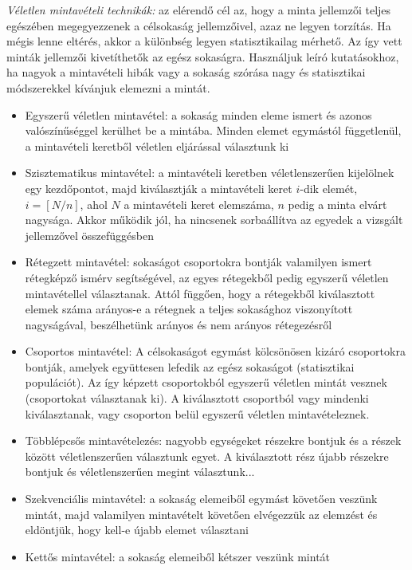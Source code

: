 \emph{Véletlen mintavételi technikák:} az elérendő cél az, hogy 
a minta jellemzői teljes egészében megegyezzenek a célsokaság jellemzőivel, azaz ne legyen torzítás. Ha mégis lenne eltérés, akkor a különbség legyen statisztikailag mérhető. Az így vett minták jellemzői kivetíthetők az egész sokaságra. Használjuk leíró kutatásokhoz, ha nagyok a mintavételi hibák vagy a sokaság szórása nagy és statisztikai módszerekkel kívánjuk elemezni a mintát.
\begin{itemize}
\item Egyszerű véletlen mintavétel: a sokaság minden eleme ismert és azonos valószínűséggel kerülhet be a mintába. Minden elemet egymástól függetlenül, a mintavételi keretből véletlen eljárással választunk ki
\item Szisztematikus mintavétel: a mintavételi keretben véletlenszerűen kijelölnek egy kezdőpontot, majd kiválasztják a mintavételi keret $i$-dik elemét, $i = [N/n]$, ahol $N$ a mintavételi keret elemszáma, $n$ pedig a minta elvárt nagysága. Akkor működik jól, ha nincsenek sorbaállítva az egyedek a vizsgált jellemzővel összefüggésben
\item Rétegzett mintavétel: sokaságot csoportokra bontják valamilyen ismert rétegképző ismérv segítségével, az egyes rétegekből pedig egyszerű véletlen mintavétellel választanak. Attól függően, hogy a rétegekből kiválasztott elemek száma arányos-e a rétegnek a teljes sokasághoz viszonyított nagyságával, beszélhetünk arányos és nem arányos rétegezésről
\item Csoportos mintavétel: A célsokaságot egymást kölcsönösen kizáró csoportokra bontják, amelyek együttesen lefedik az egész sokaságot (statisztikai populációt). Az így képzett csoportokból egyszerű véletlen mintát vesznek (csoportokat választanak ki). A kiválasztott csoportból vagy mindenki kiválasztanak, vagy csoporton belül egyszerű véletlen mintavételeznek.
\item Többlépcsős mintavételezés: nagyobb egységeket részekre bontjuk és a részek között véletlenszerűen választunk egyet. A kiválasztott rész újabb részekre bontjuk és véletlenszerűen megint választunk...
\item Szekvenciális mintavétel: a sokaság elemeiből egymást követően veszünk mintát, majd valamilyen mintavételt követően elvégezzük az elemzést és eldöntjük, hogy kell-e újabb elemet választani
\item Kettős mintavétel: a sokaság elemeiből kétszer veszünk mintát
\end{itemize}

